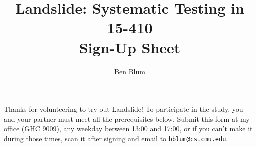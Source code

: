 \documentclass{article}
\begin{document}

\newcommand\checkbox[1]{\huge \Square & #1 \\}

\title{\bf Landslide: Systematic Testing in 15-410 \\ Sign-Up Sheet}
\author{Ben Blum}
\date{}
\maketitle

Thanks for volunteering to try out Landslide! To participate in the study, you and your partner must meet all the prerequisites below. Submit this form at my office (GHC 9009), any weekday between 13:00 and 17:00, or if you can't make it during those times, scan it after signing and email to {\tt bblum@cs.cmu.edu}.
\\
\end{document}
